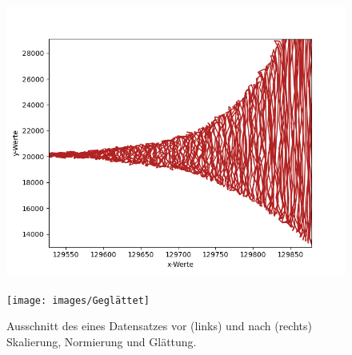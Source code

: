 \begin{figure}[htb]
    \centering
    \begin{minipage}{.5\textwidth}
        \centering
        \includegraphics[width=\linewidth]{images/EingabeNichtGlatt}
    \end{minipage}%
    \begin{minipage}{.5\textwidth}
        \centering
        \texttt{[image: images/Geglättet]}
    \end{minipage}
    \caption{Ausschnitt des eines Datensatzes vor (links) und nach (rechts) Skalierung, Normierung und Glättung.}
    \label{fig:glaettung}
\end{figure}


